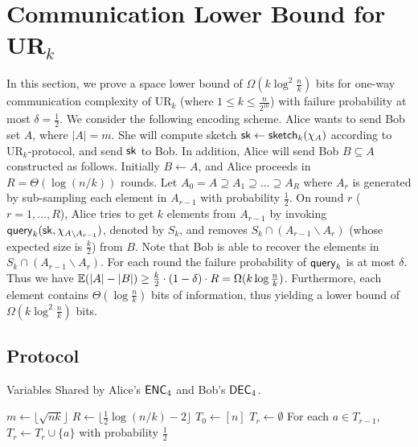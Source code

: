 \section{Communication Lower Bound for UR$_k$}\label{sec:k-samples-lb}

In this section, we prove a space lower bound of $\Omega(k\log^2
\frac{n}{k})$ bits for one-way communication complexity of UR$_k$ (where $1\le k \le \frac{n}{2^{10}}$) with failure probability at most $\delta = \frac{1}{2}$.
We consider the following encoding scheme. 
Alice wants to send Bob set $A$, where $|A|=m$. 
She will compute sketch $\mathsf{sk}\leftarrow \mathsf{sketch}_k(\chi_A)$ according to UR$_k$-protocol, and send $\mathsf{sk}$ to Bob. 
In addition, Alice will send Bob $B\subseteq A$ constructed as follows.
Initially $B\leftarrow A$, and Alice proceeds in $R=\Theta(\log (n/k))$ rounds. 
Let $A_0=A\supseteq A_1\supseteq \ldots \supseteq A_R$ where $A_r$ is generated by sub-sampling each element in $A_{r-1}$ with probability $\frac{1}{2}$. 
On round $r$ ($r=1,\ldots, R$), Alice tries to get $k$ elements from $A_{r-1}$ by invoking $\mathsf{query}_k(\mathsf{sk}, \chi_{A\backslash A_{r-1}})$, denoted by $S_k$, and removes $S_k\cap (A_{r-1}\backslash A_{r})$ (whose expected size is $\frac{k}{2}$) from $B$. 
Note that Bob is able to recover the elements in $S_k\cap (A_{r-1}\backslash A_{r})$. 
For each round the failure probability of $\mathsf{query}_k$ is at most $\delta$. 
Thus we have $\operatorname*{\mathbb{E}}(|A|-|B|)\ge \frac{k}{2}\cdot (1-\delta) \cdot R=\Omega(k\log\frac{n}{k})$. 
Furthermore, each element contains $\Theta(\log \frac{n}{k})$ bits of information, thus yielding a lower bound of $\Omega(k\log^2\frac{n}{k})$ bits.

\subsection{Protocol}
\begin{algorithm}[H] 
  \caption{Variables Shared by Alice's $\textsf{ENC}_4$ and Bob's $\textsf{DEC}_4$.} \label{algo:para4}
  \begin{algorithmic}[1] 
    \State $m\leftarrow \lfloor \sqrt{nk} \rfloor$
    \State $R\leftarrow \lfloor \frac{1}{2}\log (n/k) - 2 \rfloor$ 
    \State $T_0\leftarrow [n]$
      \State $T_r\leftarrow \emptyset$
      \State For each $a\in T_{r-1}$, $T_r\leftarrow T_r\cup \{a\}$ with probability $\frac{1}{2}$ 
    \EndFor
  \end{algorithmic}
\end{algorithm}

